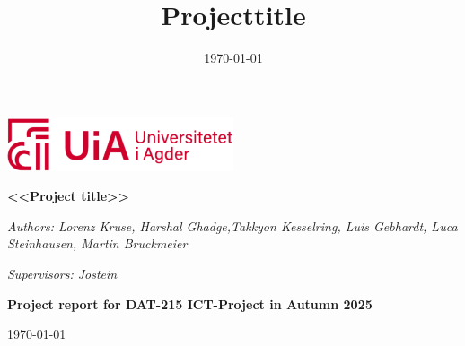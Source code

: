 \title{Projecttitle}
\date{\today}


\begin{titlepage}
	\centering
	\includegraphics[width=0.5\textwidth]{./assets/universityLogo}\par\vspace{1cm}
	
	\vspace{1cm}
	{\huge\bfseries <<Project title>> \par}
	\vspace{1cm}
	{\Large\itshape Authors: Lorenz Kruse, Harshal Ghadge,Takkyon Kesselring, Luis Gebhardt, Luca Steinhausen, Martin Bruckmeier \par}
	\vspace{1cm}
	{\Large\itshape Supervisors: Jostein\par}
	\vspace{1cm}
	{\Large\bfseries Project report for DAT-215 ICT-Project in Autumn 2025\par}
	{\Large\normalfont \today \par}
	
	\vfill
	
	
	
	
\end{titlepage}